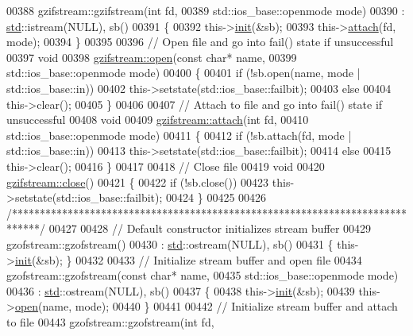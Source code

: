 \begin{DoxyCode}
{00388 gzifstream::gzifstream(\textcolor{keywordtype}{int} fd,
00389                        std::ios\_base::openmode mode)
00390 : \hyperlink{namespacestd}{std}::istream(NULL), sb()
00391 \{
00392   this->\hyperlink{structinit}{init}(&sb);
00393   this->\hyperlink{classgzofstream_a95b76eaecd03b6cbf53d2f4b1c867439}{attach}(fd, mode);
00394 \}
00395 
00396 \textcolor{comment}{// Open file and go into fail() state if unsuccessful}
00397 \textcolor{keywordtype}{void}
00398 \hyperlink{classgzifstream_a8105f9300d36dafbe8b10c204583f5a1}{gzifstream::open}(\textcolor{keyword}{const} \textcolor{keywordtype}{char}* name,
00399                  std::ios\_base::openmode mode)
00400 \{
00401   \textcolor{keywordflow}{if} (!sb.open(name, mode | std::ios\_base::in))
00402     this->setstate(std::ios\_base::failbit);
00403   \textcolor{keywordflow}{else}
00404     this->clear();
00405 \}
00406 
00407 \textcolor{comment}{// Attach to file and go into fail() state if unsuccessful}
00408 \textcolor{keywordtype}{void}
00409 \hyperlink{classgzifstream_a24aff901c395acbdaddb7878f4ddb7aa}{gzifstream::attach}(\textcolor{keywordtype}{int} fd,
00410                    std::ios\_base::openmode mode)
00411 \{
00412   \textcolor{keywordflow}{if} (!sb.attach(fd, mode | std::ios\_base::in))
00413     this->setstate(std::ios\_base::failbit);
00414   \textcolor{keywordflow}{else}
00415     this->clear();
00416 \}
00417 
00418 \textcolor{comment}{// Close file}
00419 \textcolor{keywordtype}{void}
00420 \hyperlink{classgzifstream_a073fadd9dc90195c47a6ae2d863c8ace}{gzifstream::close}()
00421 \{
00422   \textcolor{keywordflow}{if} (!sb.close())
00423     this->setstate(std::ios\_base::failbit);
00424 \}
00425 
00426 \textcolor{comment}{/*****************************************************************************/}
00427 
00428 \textcolor{comment}{// Default constructor initializes stream buffer}
00429 gzofstream::gzofstream()
00430 : \hyperlink{namespacestd}{std}::ostream(NULL), sb()
00431 \{ this->\hyperlink{structinit}{init}(&sb); \}
00432 
00433 \textcolor{comment}{// Initialize stream buffer and open file}
00434 gzofstream::gzofstream(\textcolor{keyword}{const} \textcolor{keywordtype}{char}* name,
00435                        std::ios\_base::openmode mode)
00436 : \hyperlink{namespacestd}{std}::ostream(NULL), sb()
00437 \{
00438   this->\hyperlink{structinit}{init}(&sb);
00439   this->\hyperlink{classgzofstream_aee3eb31f07eda7f5ad1f60d59ea4b239}{open}(name, mode);
00440 \}
00441 
00442 \textcolor{comment}{// Initialize stream buffer and attach to file}
00443 gzofstream::gzofstream(\textcolor{keywordtype}{int} fd,
}
\end{DoxyCode}
